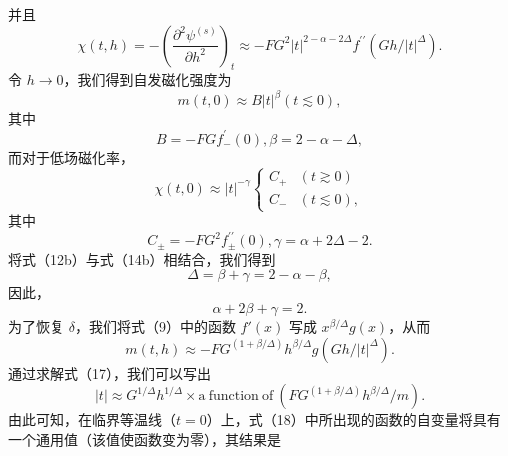并且
\begin{equation}\tag{12.10.9}\label{eq:12.10.9}
\chi ( t , h ) = - \left( \frac { \partial ^{2} \psi ^{( s )} } { \partial h ^{2} } \right) _ { t } \approx - F G ^{2} | t | ^{2 - \alpha - 2 \Delta} f ^{\prime \prime} ( G h / | t | ^{\Delta} ) .
\end{equation}
令 \(h \rightarrow 0\)，我们得到自发磁化强度为
\begin{equation}\tag{12.10.10}\label{eq:12.10.10}
m ( t , 0 ) \approx B | t | ^{\beta}  ( t \lesssim 0 ) ,
\end{equation}
其中
\begin{equation}\tag{12.10.11}\label{eq:12.10.11}
B = - F G f _ { - } ^{\prime} ( 0 ) ,  \beta = 2 - \alpha - \Delta ,
\end{equation}
而对于低场磁化率，
\begin{equation}\tag{12.10.12}\label{eq:12.10.12}
\chi ( t , 0 ) \approx | t | ^{- \gamma} \left\{ \begin{array}{ll} { C _ { + } } & { ( t \gtrsim 0 ) } \\{ C _ { - } } & { ( t \lesssim 0 ) , } \end{array} \right.
\end{equation}
其中
\begin{equation}\tag{12.10.13}\label{eq:12.10.13}
C _ { \pm } = - F G ^{2} f _ { \pm } ^{\prime \prime} ( 0 ) ,  \gamma = \alpha + 2 \Delta - 2 .
\end{equation}
将式（12b）与式（14b）相结合，我们得到
\begin{equation}\tag{12.10.14}\label{eq:12.10.14}
\Delta = \beta + \gamma = 2 - \alpha - \beta ,
\end{equation}
因此，
\begin{equation}\tag{12.10.15}\label{eq:12.10.15}
\alpha + 2 \beta + \gamma = 2 .
\end{equation}
为了恢复 \(\delta\)，我们将式（9）中的函数 \(f'(x)\) 写成 \(x^{\beta/\Delta}g(x)\)，从而
\begin{equation}\tag{12.10.16}\label{eq:12.10.16}
m ( t , h ) \approx - F G ^{( 1 + \beta / \Delta )} h ^{\beta / \Delta} g ( G h / | t | ^{\Delta} ) .
\end{equation}
通过求解式（17），我们可以写出
\begin{equation}\tag{12.10.17}\label{eq:12.10.17}
| t | \approx G ^{1 / \Delta} h ^{1 / \Delta} \times \mathrm { a ~ f u n c t i o n ~ o f ~ } ( F G ^{( 1 + \beta / \Delta )} h ^{\beta / \Delta} / m ) .
\end{equation}
由此可知，在临界等温线（\(t=0\)）上，式（18）中所出现的函数的自变量将具有一个通用值（该值使函数变为零），其结果是
